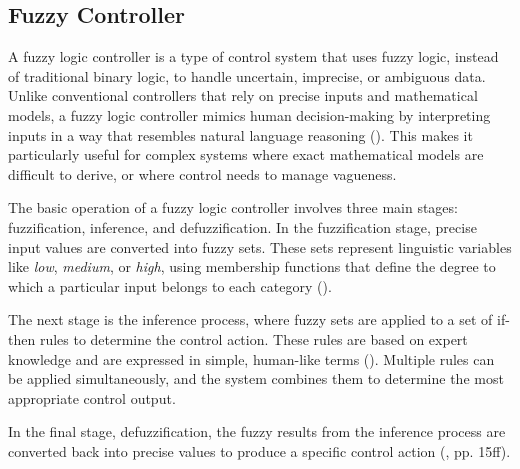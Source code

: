\subsection{Fuzzy Controller}

A fuzzy logic controller is a type of control system that uses fuzzy logic, instead of traditional binary logic, to handle uncertain, imprecise, or ambiguous data. Unlike conventional controllers that rely on precise inputs and mathematical models, a fuzzy logic controller mimics human decision-making by interpreting inputs in a way that resembles natural language reasoning (\cite{rehman_introduction_2017}). This makes it particularly useful for complex systems where exact mathematical models are difficult to derive, or where control needs to manage vagueness.

The basic operation of a fuzzy logic controller involves three main stages: fuzzification, inference, and defuzzification. In the fuzzification stage, precise input values are converted into fuzzy sets. These sets represent linguistic variables like \textit{low}, \textit{medium}, or \textit{high}, using membership functions that define the degree to which a particular input belongs to each category (\cite{liu_real-time_2009}).

The next stage is the inference process, where fuzzy sets are applied to a set of if-then rules to determine the control action. These rules are based on expert knowledge and are expressed in simple, human-like terms (\cite{dahiya_introduction_2016}). Multiple rules can be applied simultaneously, and the system combines them to determine the most appropriate control output.

In the final stage, defuzzification, the fuzzy results from the inference process are converted back into precise values to produce a specific control action (\cite{mahmoud_basics_2018}, pp. 15ff).

